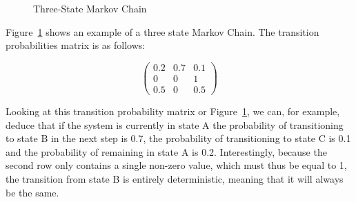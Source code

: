 \begin{figure}[h!]
\begin{center}
\end{center}
\caption{Three-State Markov Chain}
\label{3statemarkovchain}
\end{figure}

Figure~\ref{3statemarkovchain} shows an example of a three state Markov Chain. The transition probabilities matrix is as follows:

\[
 \begin{pmatrix}
  0.2 & 0.7 & 0.1 \\
  0 & 0 & 1 \\
  0.5 & 0 & 0.5
 \end{pmatrix}
\]

Looking at this transition probability matrix or Figure~\ref{3statemarkovchain}, we can, for example, deduce that if the system is currently in state A the probability of transitioning to state B in the next step is 0.7, the probability of transitioning to state C is 0.1 and the probability of remaining in state A is 0.2. Interestingly, because the second row only contains a single non-zero value, which must thus be equal to 1, the transition from state B is entirely deterministic, meaning that it will always be the same.




